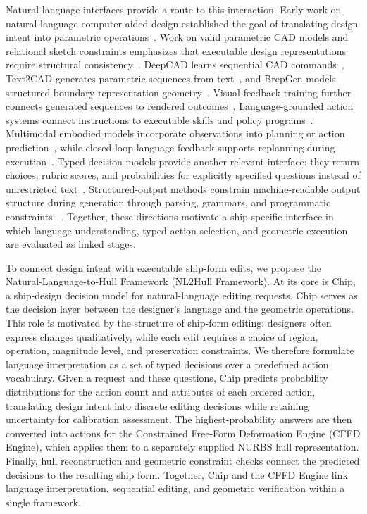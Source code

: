 \documentclass[a4paper,fleqn]{cas-dc}
\begin{document}
Natural-language interfaces provide a route to this interaction. Early work on
natural-language computer-aided design established the goal of translating design
intent into parametric operations~\citep{samad1985cad}. Work on valid parametric
CAD models and relational sketch constraints emphasizes that executable design
representations require structural consistency~\citep{hoffmann2001valid,seff2020sketchgraphs}.
DeepCAD learns sequential CAD commands~\citep{wu2021deepcad}, Text2CAD generates
parametric sequences from text~\citep{khan2024text2cad}, and BrepGen models
structured boundary-representation geometry~\citep{xu2024brepgen}.
Visual-feedback training further connects generated sequences to rendered
outcomes~\citep{wang2025cadfusion}.
Language-grounded action systems connect instructions to executable skills and
policy programs~\citep{ahn2022saycan,liang2022codepolicies}. Multimodal embodied
models incorporate observations into planning or action prediction~\citep{driess2023palme,brohan2023rt2},
while closed-loop language feedback supports replanning during execution~\citep{huang2022innermonologue}.
Typed decision models provide another relevant interface: they return choices,
rubric scores, and probabilities for explicitly specified questions instead of
unrestricted text~\citep{deusser2026jev}. Structured-output methods constrain machine-readable output structure during
generation through parsing, grammars, and programmatic constraints
~\citep{scholak2021picard,geng2023grammar,willard2023guided,beurer2022lmql}.
Together, these directions motivate a ship-specific interface in which language
understanding, typed action selection, and geometric execution are evaluated as
linked stages.

To connect design intent with executable ship-form edits, we propose the
Natural-Language-to-Hull Framework (NL2Hull Framework). At its core is Chip, a ship-design decision model for
natural-language editing requests. Chip serves as the decision layer between the designer's
language and the geometric operations. This role is motivated by the structure
of ship-form editing: designers often express changes qualitatively, while each
edit requires a choice of region, operation, magnitude level, and preservation
constraints. We therefore formulate language interpretation as a set of typed
decisions over a predefined action vocabulary. Given a request and these
questions, Chip predicts probability distributions for the action count and
attributes of each ordered action, translating design intent into discrete
editing decisions while retaining uncertainty for calibration assessment.
The highest-probability answers are then converted into actions for the
Constrained Free-Form Deformation Engine (CFFD Engine), which applies them to a
separately supplied NURBS hull representation. Finally, hull reconstruction and
geometric constraint checks connect the predicted decisions to the resulting
ship form. Together, Chip and the CFFD Engine link language interpretation,
sequential editing, and geometric verification within a single framework.
\end{document}
